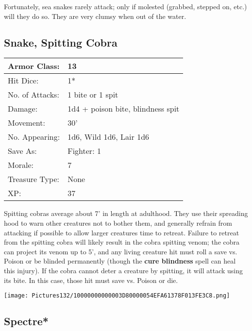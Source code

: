 \documentclass[a4paper,twoside,openany,10pt]{book}
\begin{document}
\begin{multicols}{2}
Fortunately, sea snakes rarely attack; only if molested (grabbed, stepped on, etc.) will they do so. They are very clumsy when out of the water.

\subsection*{Snake, Spitting Cobra}\label{snake-spitting-cobra}

\begin{tabularx}{0.50\textwidth}{@{}lX@{}}
Armor Class: & 13 \\\hline
Hit Dice: & 1* \\\hline
No. of Attacks: & 1 bite or 1 spit \\\hline
Damage: & 1d4 + poison bite, blindness spit \\\hline
Movement: & 30' \\\hline
No. Appearing: & 1d6, Wild 1d6, Lair 1d6 \\\hline
Save As: & Fighter: 1 \\\hline
Morale: & 7 \\\hline
Treasure Type: & None \\\hline
XP: & 37 \\\hline
\end{tabularx}\medskip

Spitting cobras average about 7' in length at adulthood. They use their spreading hood to warn other creatures not to bother them, and generally refrain from attacking if possible to allow larger creatures time to retreat. Failure to retreat from the spitting cobra will likely result in the cobra spitting venom; the cobra can project its venom up to 5', and any living creature hit must roll a save vs. Poison or be blinded permanently (though the \textbf{cure blindness} spell can heal this injury). If the cobra cannot deter a creature by spitting, it will attack using its bite. In this case, those hit must save vs. Poison or die.

\vfill

\begin{center} \texttt{[image: Pictures132/10000000000003D80000054EFA61378F013FE3C8.png]} \end{center}

\columnbreak


\subsection*{Spectre*}\label{spectre}


\end{multicols}
\end{document}
